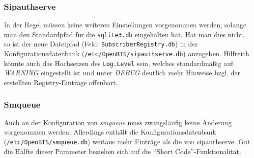 \subsubsection{Sipauthserve}
In der Regel müssen keine weiteren Einstellungen vorgenommen werden, solange man den Standardpfad für die \verb|sqlite3.db| eingehalten hat. Hat man dies nicht, so ist der neue Dateipfad (Feld: \verb|SubscriberRegistry.db|) in der Konfigurationsdatenbank (\verb|/etc/OpenBTS/sipauthserve.db|) anzugeben. Hilfreich könnte auch das Hochsetzen des \verb|Log.Level| sein, welches standardmäßig auf \textit{WARNING} eingestellt ist und unter \textit{DEBUG} deutlich mehr Hinweise bzgl. der erstellten Registry-Einträge offenbart.

\subsubsection{Smqueue}
Auch an der Konfiguration von \textit{smqueue} muss zwangsläufig keine Änderung vorgenommen werden. Allerdings enthält die Konfigurationsdatenbank (\verb|/etc/OpenBTS/smqueue.db|) weitaus mehr Einträge als die von sipauthserve. Gut die Hälfte dieser Parameter beziehen sich auf die "`Short Code"'-Funktionalität.

